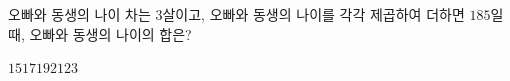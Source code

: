 오빠와 동생의 나이 차는 $3$살이고, 오빠와 동생의 나이를 각각 제곱하여 더하면 $185$일 때, 오빠와 동생의 나이의 합은?
\begin{choices32}{$15$}{$17$}{$19$}{$21$}{$23$}\end{choices32}
